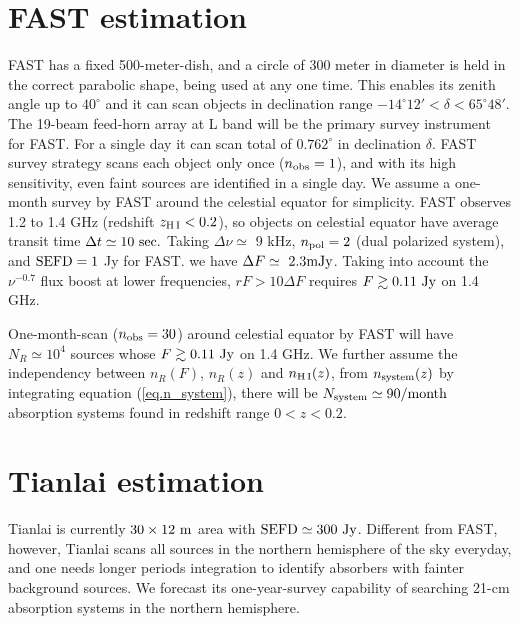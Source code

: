 \documentclass[]{raa}
\newcommand{\HI}{{H{\small\,I}}}
\begin{document}
\section{FAST estimation}\label{sec.FAST}

FAST has a fixed 500-meter-dish, and a circle of 300 meter in diameter is held
in the correct parabolic shape, being used at any one time. This
enables its zenith angle up to $40^\circ$ and it can scan objects
in declination range $-14^\circ 12'<\delta<65^\circ 48'$.
The 19-beam feed-horn array at L band will be the primary survey
instrument for FAST. For a single day it can scan total of $0.762^\circ$
in declination $\delta$. FAST survey strategy scans each object
only once ($n_{\rm obs}=1$), and with its high sensitivity,
even faint sources are identified in a single day. 
We assume a one-month survey by FAST
around the celestial equator for simplicity. FAST observes
1.2 to 1.4 GHz (redshift $z_{\rm \HI}<0.2$), so objects on celestial equator
have average transit time $\Delta t \simeq 10\ {\rm sec.}$
Taking $\Delta\nu\simeq$ 9 kHz, $n_{\rm pol}=2$
(dual polarized system), and
${\rm SEFD}=1$ Jy for FAST.
we have $\Delta F \simeq\ 2.3 {\rm mJy}$.
Taking into account the $\nu^{-0.7}$ flux boost at lower
frequencies, $rF>10\Delta F$ requires $F\gtrsim 0.11\ {\rm Jy}$ on 1.4 GHz.

One-month-scan ($n_{\rm obs}=30$) around celestial equator by FAST will have
$N_R\simeq 10^4$ sources whose $F\gtrsim 0.11\ {\rm Jy}$ on 1.4 GHz.
We further assume the independency between $n_R(F)$, $n_R(z)$
and $n_{\rm\HI}(z)$, from $n_{\rm system}(z)$ by integrating
equation (\ref{eq.n_system}), there will be $N_{\rm system}\simeq 90 {\rm /month}$ absorption
systems found in redshift range $0<z<0.2$.


\section{Tianlai estimation}\label{sec.Tianlai}

Tianlai is currently $30\times 12\ {\rm m}$ area with
${\rm SEFD}\simeq 300\ {\rm Jy}$. Different from FAST, however,
Tianlai scans all sources in the northern hemisphere of the sky
everyday, and one needs longer periods integration to
identify absorbers with fainter background sources.
We forecast its one-year-survey capability of searching 21-cm
absorption systems in the northern hemisphere.
\end{document}
